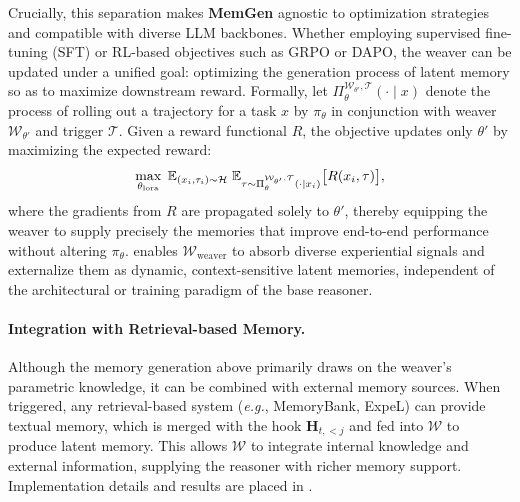 \documentclass[]{fairmeta}
\newcommand{\ourmethod}{{\fontfamily{lmtt}\selectfont \textbf{MemGen}}\xspace}
\begin{document}
Crucially, this separation makes \ourmethod agnostic to optimization strategies and compatible with diverse LLM backbones. Whether employing supervised fine-tuning (SFT) or RL-based objectives such as GRPO or DAPO, the weaver can be updated under a unified goal: optimizing the generation process of latent memory so as to maximize downstream reward. Formally, let $\Pi_{\theta}^{\mathcal{W}_{\theta'}, \mathcal{T}}(\cdot \mid x)$ denote the process of rolling out a trajectory for a task $x$ by $\pi_\theta$ in conjunction with weaver $\mathcal{W}_{\theta'}$ and trigger $\mathcal{T}$.
Given a reward functional $R$, the objective updates only $\theta'$ by maximizing the expected reward:
\begin{equation}\label{eq:train-weaver}
\small
\max_{\theta_\text{lora}} \; \mathbb{E}_{(x_i,\tau_i)\sim \mathcal{H}} \; \mathbb{E}_{\tau \sim \Pi_{\theta}^{\mathcal{W}_{\theta'}, \mathcal{T}}(\cdot \mid x_i)} \big[ R(x_i,\tau) \big],
\end{equation}
where the gradients from $R$ are propagated solely to $\theta'$, thereby equipping the weaver to supply precisely the memories that improve end-to-end performance without altering $\pi_\theta$.  enables $\mathcal{W}_\text{weaver}$ to absorb diverse experiential signals and externalize them as dynamic, context-sensitive latent memories, independent of the architectural or training paradigm of the base reasoner.

\vspace{-1em}
\paragraph{Integration with Retrieval-based Memory.}  Although the memory generation above primarily draws on the weaver’s parametric knowledge, it can be combined with external memory sources. When triggered, any retrieval-based system (\textit{e.g.}, MemoryBank, ExpeL) can provide textual memory, which is merged with the hook $\mathbf{H}_{t,<j}$ and fed into $\mathcal{W}$ to produce latent memory. This allows $\mathcal{W}$ to integrate internal knowledge and external information, supplying the reasoner with richer memory support. Implementation details and results are placed in .
\end{document}
